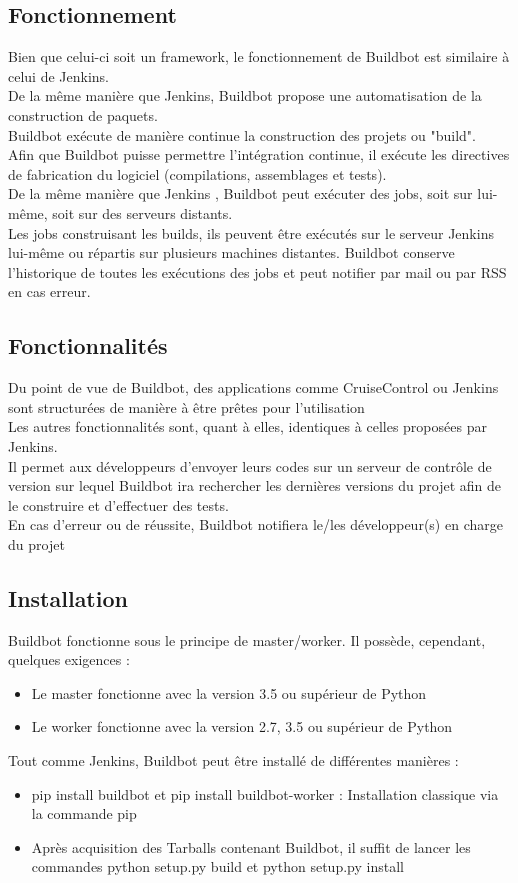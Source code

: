 \documentclass[12pt]{article}
\begin{document}
\subsection{Fonctionnement}
Bien que celui-ci soit un framework, le fonctionnement de Buildbot est similaire à celui de Jenkins.
\\
De la même manière que Jenkins, Buildbot propose une automatisation de la construction de paquets.
\\
Buildbot exécute de manière continue la construction des projets ou "build".
\\ 
Afin que Buildbot puisse permettre l'intégration continue, il exécute les directives de fabrication du logiciel (compilations, assemblages et tests).
\\
De la même manière que Jenkins , Buildbot peut exécuter des jobs, soit sur lui-même, soit sur des serveurs distants.
\\
Les jobs construisant les builds, ils peuvent être exécutés sur le serveur Jenkins lui-même ou répartis sur plusieurs machines distantes. Buildbot conserve l'historique de toutes les exécutions des jobs et peut notifier par mail ou par RSS en cas erreur.

\subsection{Fonctionnalités}
Du point de vue de Buildbot, des applications comme CruiseControl ou Jenkins sont structurées de manière à être prêtes pour l'utilisation
\\
Les autres fonctionnalités sont, quant à elles, identiques à celles proposées par Jenkins.
\\
Il permet aux développeurs d'envoyer leurs codes sur un serveur de contrôle de version sur lequel Buildbot ira rechercher les dernières versions du projet afin de le construire et d'effectuer des tests.
\\
En cas d'erreur ou de réussite, Buildbot notifiera le/les développeur(s) en charge du projet

\subsection{Installation}
Buildbot fonctionne sous le principe de master/worker. Il possède, cependant, quelques exigences : 
\begin{itemize}
    \item Le master fonctionne avec la version 3.5 ou supérieur de Python
    \item Le worker fonctionne avec la version 2.7, 3.5 ou supérieur de Python
\end{itemize}
\vspace{0.5cm}
Tout comme Jenkins, Buildbot peut être installé de différentes manières :
\begin{itemize}
    \item pip install buildbot et pip install buildbot-worker : Installation classique via la commande pip
    \item Après acquisition des Tarballs contenant Buildbot, il suffit de lancer les commandes python setup.py build et python setup.py install
\end{itemize}
\end{document}

